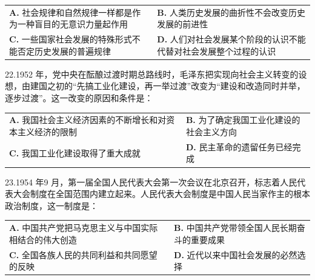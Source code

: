 \documentclass[UTF8,11pt]{ctexart}
\begin{document}
\begin{center}\begin{tabular}{>{\raggedright\arraybackslash}p{\dimexpr(\linewidth-4\tabcolsep)/2\relax}>{\raggedright\arraybackslash}p{\dimexpr(\linewidth-4\tabcolsep)/2\relax}}
\textbf{A.} 社会规律和自然规律一样都是作为一种盲目的无意识力量起作用 & \textbf{B.} 人类历史发展的曲折性不会改变历史发展的前进性\\[.35em]
\textbf{C.} 一些国家社会发展的特殊形式不能否定历史发展的普遍规律 & \textbf{D.} 人们对社会发展某个阶段的认识不能代替对社会发展整个过程的认识\\[.35em]\end{tabular}\end{center}

22.1952 年，党中央在酝酿过渡时期总路线时，毛泽东把实现向社会主义转变的设想，由建国之初的“先搞工业化建设，再一举过渡”改变为“建设和改造同时并举，逐步过渡”。这一改变的原因和条件是：


\begin{center}\begin{tabular}{>{\raggedright\arraybackslash}p{\dimexpr(\linewidth-4\tabcolsep)/2\relax}>{\raggedright\arraybackslash}p{\dimexpr(\linewidth-4\tabcolsep)/2\relax}}
\textbf{A.} 我国社会主义经济因素的不断增长和对资本主义经济的限制 & \textbf{B.} 为了确定我国工业化建设的社会主义方向\\[.35em]
\textbf{C.} 我国工业化建设取得了重大成就 & \textbf{D.} 民主革命的遗留任务已经完成\\[.35em]\end{tabular}\end{center}

23.1954 年9 月，第一届全国人民代表大会第一次会议在北京召开，标志着人民代表大会制度在全国范围内建立起来。人民代表大会制度是中国人民当家作主的根本政治制度，这一制度是：


\begin{center}\begin{tabular}{>{\raggedright\arraybackslash}p{\dimexpr(\linewidth-4\tabcolsep)/2\relax}>{\raggedright\arraybackslash}p{\dimexpr(\linewidth-4\tabcolsep)/2\relax}}
\textbf{A.} 中国共产党把马克思主义与中国实际相结合的伟大创造 & \textbf{B.} 中国共产党带领全国人民长期奋斗的重要成果\\[.35em]
\textbf{C.} 全国各族人民的共同利益和共同愿望的反映 & \textbf{D.} 近代以来中国社会发展的必然选择\\[.35em]\end{tabular}\end{center}
\end{document}
